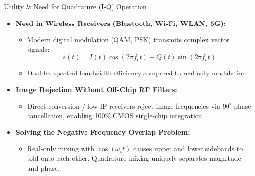 \documentclass{beamer}
\begin{document}
\begin{frame}{Utility \& Need for Quadrature (I-Q) Operation}
  \begin{itemize}
    \item \textbf{Need in Wireless Receivers (Bluetooth, Wi-Fi, WLAN, 5G):}
    \begin{itemize}
      \item Modern digital modulation (QAM, PSK) transmits complex vector signals:
      \begin{equation*}
        s(t) = I(t)\cos(2\pi f_c t) - Q(t)\sin(2\pi f_c t)
      \end{equation*}
      \item Doubles spectral bandwidth efficiency compared to real-only modulation.
    \end{itemize}
    \vspace{0.15cm}
    \item \textbf{Image Rejection Without Off-Chip RF Filters:}
    \begin{itemize}
      \item Direct-conversion / low-IF receivers reject image frequencies via $90^\circ$ phase cancellation, enabling 100\% CMOS single-chip integration.
    \end{itemize}
    \vspace{0.15cm}
    \item \textbf{Solving the Negative Frequency Overlap Problem:}
    \begin{itemize}
      \item Real-only mixing with $\cos(\omega_c t)$ causes upper and lower sidebands to fold onto each other. Quadrature mixing uniquely separates magnitude and phase.
    \end{itemize}
  \end{itemize}
\end{frame}
\end{document}
